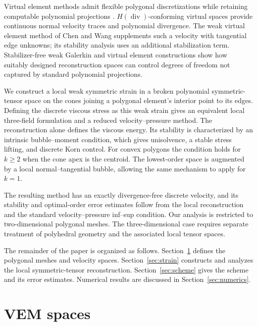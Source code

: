 \documentclass[review,hidelinks,onefignum,onetabnum]{siamart251216}
\begin{document}
Virtual element methods admit flexible polygonal discretizations while
retaining computable polynomial projections \cite{BBCMMR2013}.
$H(\operatorname{div})$-conforming virtual spaces
\cite{BBMR2016} provide continuous normal velocity traces and polynomial
divergence. The weak virtual element method of Chen and Wang
\cite{ChenWang2019} supplements such a velocity with tangential edge
unknowns; its stability analysis uses an additional stabilization term.
Stabilizer-free weak Galerkin and virtual element constructions
\cite{MuYeZhang2021,ChenHuangWei2024} show how suitably designed
reconstruction spaces can control degrees of freedom not captured by
standard polynomial projections.

We construct a local weak symmetric strain in a broken polynomial
symmetric-tensor space on the cones joining a polygonal element's
interior point to its edges. Defining the discrete viscous stress as this
weak strain gives an equivalent local three-field formulation and a
reduced velocity--pressure method. The reconstruction alone defines the
viscous energy. Its stability is characterized by an intrinsic
bubble--moment condition, which gives unisolvence, a stable stress
lifting, and discrete Korn control. For convex polygons the condition
holds for $k\ge2$ when the cone apex is the centroid. The lowest-order
space is augmented by a local normal--tangential bubble, allowing the
same mechanism to apply for $k=1$.

The resulting method has an exactly divergence-free discrete velocity,
and its stability and optimal-order error estimates follow from the
local reconstruction and the standard velocity--pressure inf--sup
condition. Our analysis is restricted to two-dimensional polygonal
meshes. The three-dimensional case requires separate treatment of
polyhedral geometry and the associated local tensor spaces.

The remainder of the paper is organized as follows.
Section~\ref{sec:spaces} defines the polygonal meshes and velocity
spaces. Section~\ref{sec:strain} constructs and analyzes the local
symmetric-tensor reconstruction. Section~\ref{sec:scheme} gives the
scheme and its error estimates. Numerical results are discussed in
Section~\ref{sec:numerics}.

\section{VEM spaces}\label{sec:spaces}
\end{document}
